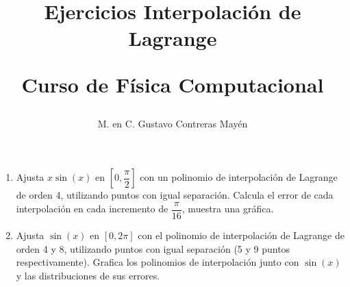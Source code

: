 \documentclass[11pt]{article}
\title{Ejercicios Interpolación de Lagrange \\ \begin{large}Curso de Física Computacional\end{large}}
\author{M. en C. Gustavo Contreras Mayén}
\date{ }
\begin{document}
\maketitle
\begin{enumerate}
\item Ajusta $x \sin(x)$ en $[0, \dfrac{\pi}{2}]$ con un polinomio de interpolación de Lagrange de orden 4, utilizando puntos con igual separación. Calcula el error de cada interpolación en cada incremento de $\dfrac{\pi}{16}$, muestra una gráfica.
\item Ajusta $\sin(x)$ en $[0, 2\pi]$ con el polinomio de interpolación de Lagrange de orden 4 y 8, utilizando puntos con igual separación (5 y 9 puntos respectivamente). Grafica los polinomios de interpolación junto con $\sin(x)$ y las distribuciones de sus errores.
\end{enumerate}
\end{document}

